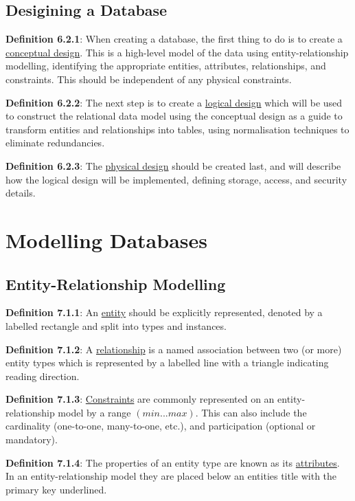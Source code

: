 \documentclass{article}
\newcommand{\separate}[1] {\vspace{#1 pt}\noindent}
\newcommand{\definition}[2]{\textbf{Definition #1}: #2\label{def:#1}}
\begin{document}
\subsection{Desigining a Database}

\definition{6.2.1}{When creating a database, the first thing to do is to create a \underline{conceptual design}. This is a high-level model of the data using entity-relationship modelling, identifying the appropriate entities, attributes, relationships, and constraints. This should be independent of any physical constraints.}

\separate{7}\definition{6.2.2}{The next step is to create a \underline{logical design} which will be used to construct the relational data model using the conceptual design as a guide to transform entities and relationships into tables, using normalisation techniques to eliminate redundancies.}

\separate{7}\definition{6.2.3}{The \underline{physical design} should be created last, and will describe how the logical design will be implemented, defining storage, access, and security details.}

\newpage\section{Modelling Databases}

\subsection{Entity-Relationship Modelling}

\definition{7.1.1}{An \underline{entity} should be explicitly represented, denoted by a labelled rectangle and split into types and instances.}

\separate{7}\definition{7.1.2}{A \underline{relationship} is a named association between two (or more) entity types which is represented by a labelled line with a triangle indicating reading direction.}

\separate{7}\definition{7.1.3}{\underline{Constraints} are commonly represented on an entity-relationship model by a range \((min...max)\). This can also include the cardinality (one-to-one, many-to-one, etc.), and participation (optional or mandatory).}

\separate{7}\definition{7.1.4}{The properties of an entity type are known as its \underline{attributes}. In an entity-relationship model they are placed below an entities title with the primary key underlined.}
\end{document}
